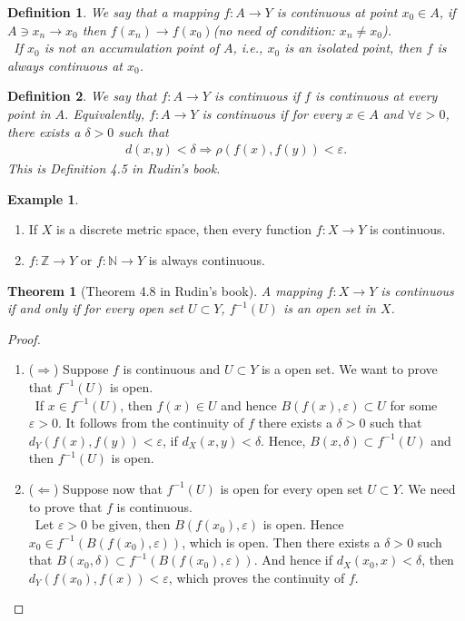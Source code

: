 \documentclass[12pt,leqno]{amsart}
\newtheorem{definition}{Definition}[section]
\newtheorem{theorem}{Theorem}[section]
\theoremstyle{definition}
\newtheorem{example}{Example}[section]
\numberwithin{equation}{subsection}
\begin{document}
\begin{definition}
We say that a mapping $f:A\to Y$ is continuous at point $x_0\in A$, if $A\ni x_n\to x_0$ then $f(x_n)\to f(x_0)$(no need of condition: $x_n\neq x_0$). \\
\hspace*{1em}\, If $x_0$ is not an accumulation point of $A$, i.e., $x_0$ is an isolated point, then $f$ is always continuous at $x_0$.
\end{definition}

\begin{definition}
We say that $f:A\to Y$ is continuous if $f$ is continuous at every point in $A$. Equivalently, $f:A\to Y$ is continuous if for every $x\in A$ and $\forall\varepsilon>0$, there exists a $\delta>0$ such that 
\begin{align*}
    d(x,y)<\delta \Rightarrow \rho(f(x),f(y))<\varepsilon.
\end{align*}
This is Definition 4.5 in Rudin's book. 
\end{definition}

\begin{example}
~\begin{enumerate}
    \item If $X$ is a discrete metric space, then every function $f:X\to Y$ is continuous.
    \item $f:\mathbb{Z}\to Y$ or $f:\mathbb{N}\to Y$ is always continuous.
\end{enumerate}
\end{example}

\medskip

\begin{theorem}[Theorem 4.8 in Rudin's book]
A mapping $f:X\to Y$ is continuous if and only if for every open set $U\subset Y$, $f^{-1}(U)$ is an open set in $X$.
\end{theorem}
\begin{proof}
~\begin{enumerate}
    \item ($\Rightarrow$) Suppose $f$ is continuous and $U\subset Y$ is a open set. We want to prove that $f^{-1}(U)$ is open. \\
    \hspace*{1em}\, If $x\in f^{-1}(U)$, then $f(x)\in U$ and hence $B(f(x),\varepsilon)\subset U$ for some $\varepsilon > 0$. It follows from the continuity of $f$ there exists a $\delta > 0$ such that $d_Y(f(x),f(y))<\varepsilon$, if $d_X(x,y) < \delta$. Hence, $B(x,\delta)\subset f^{-1}(U)$ and then $f^{-1}(U)$ is open.
    \item ($\Leftarrow$) Suppose now that $f^{-1}(U)$ is open for every open set $U\subset Y$. We need to prove that $f$ is continuous. \\
    \hspace*{1em}\, Let $\varepsilon>0$ be given, then $B(f(x_0),\varepsilon)$ is open. Hence $x_0\in f^{-1}(B(f(x_0),\varepsilon))$, which is open. Then there exists a $\delta>0$ such that $B(x_0,\delta)\subset f^{-1}(B(f(x_0),\varepsilon))$. And hence if $d_X(x_0,x)<\delta$, then $d_Y(f(x_0),f(x))<\varepsilon$, which proves the continuity of $f$.
\end{enumerate}
\end{proof}
\end{document}
